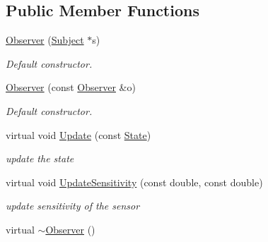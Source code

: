 \subsection*{Public Member Functions}
\begin{DoxyCompactItemize}
\item 
\hyperlink{classObserver_af1d4b6669a3ad3bf263794283502762e}{Observer} (\hyperlink{classSubject}{Subject} $\ast$s)\hypertarget{classObserver_af1d4b6669a3ad3bf263794283502762e}{}\label{classObserver_af1d4b6669a3ad3bf263794283502762e}

\begin{DoxyCompactList}\small\item\em Default constructor. \end{DoxyCompactList}\item 
\hyperlink{classObserver_ad2baecd66bea6330488897b57c94d1b4}{Observer} (const \hyperlink{classObserver}{Observer} \&o)\hypertarget{classObserver_ad2baecd66bea6330488897b57c94d1b4}{}\label{classObserver_ad2baecd66bea6330488897b57c94d1b4}

\begin{DoxyCompactList}\small\item\em Default constructor. \end{DoxyCompactList}\item 
virtual void \hyperlink{classObserver_ad922369211cf6693c9ab541ab61a92f5}{Update} (const \hyperlink{structState}{State})
\begin{DoxyCompactList}\small\item\em update the state \end{DoxyCompactList}\item 
virtual void \hyperlink{classObserver_ab19e32cbf78f39315bd64a3ab98808d9}{Update\+Sensitivity} (const double, const double)
\begin{DoxyCompactList}\small\item\em update sensitivity of the sensor \end{DoxyCompactList}\item 
virtual \hyperlink{classObserver_afcc6b67be6c386f2f3d2c363aa59cb47}{$\sim$\+Observer} ()\hypertarget{classObserver_afcc6b67be6c386f2f3d2c363aa59cb47}{}\label{classObserver_afcc6b67be6c386f2f3d2c363aa59cb47}


\end{DoxyCompactItemize}
